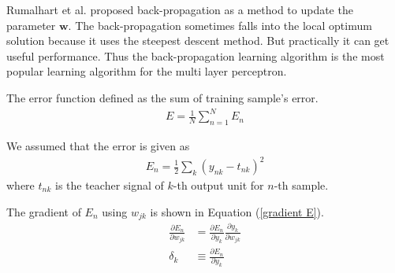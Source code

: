 \documentclass[a4paper,12pt]{article}
\begin{document}
Rumalhart et al.\cite{Rumelhart1986} proposed back-propagation as a method to update the parameter ${\bm w}$.
The back-propagation sometimes falls into the local optimum solution because it uses the steepest descent method. But practically it can get useful performance. Thus the back-propagation learning algorithm is the most popular learning algorithm for the multi layer perceptron. \par
The error function defined as the sum of training sample's error.
\begin{align}
E = \frac{1}{N}\sum_{n=1}^N{E_n}
\end{align} \par
We assumed that the error is given as
\begin{align}
E_n=\frac{1}{2}\sum_k{(y_{nk}-t_{nk})}^2
\end{align}
where $t_{nk}$ is the teacher signal of $k$-th output unit for $n$-th sample. \par
The gradient of $E_n$ using $w_{jk}$ is shown in Equation (\ref{gradient E}).
\begin{align} \label{gradient E}
\frac{\partial E_n}{\partial w_{jk}}&=\frac{\partial E_n}{\partial y_k} \frac{\partial y_k}{\partial w_{jk}} \\ \label{error}
\delta_k &\equiv \frac{\partial E_n}{\partial y_k}
\end{align}
\end{document}
